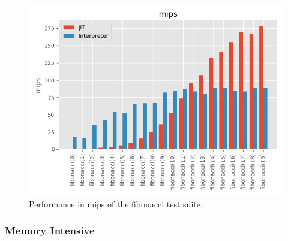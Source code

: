 \begin{figure}
    \centering
    \includegraphics{output/graphs/tests/fibonacci/mips.png}
    \caption{Performance in mips of the fibonacci test suite.}
    \label{figure:fibonacci-mips}
\end{figure}

\subsubsection{Memory Intensive}
